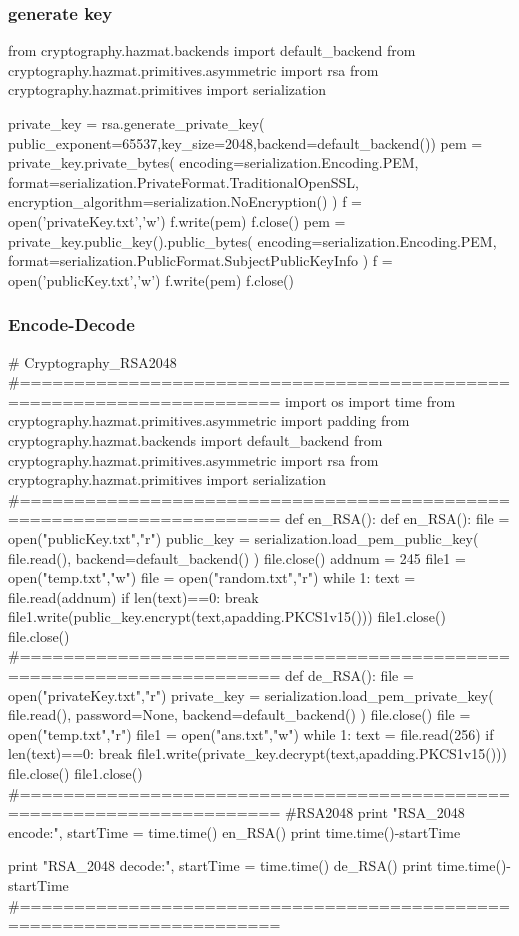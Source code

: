 \documentclass{article}
\begin{document}
\subsubsection{generate key}
\begin{python}
from cryptography.hazmat.backends import default_backend
from cryptography.hazmat.primitives.asymmetric import rsa
from cryptography.hazmat.primitives import serialization

private_key = rsa.generate_private_key(
    public_exponent=65537,key_size=2048,backend=default_backend())
pem = private_key.private_bytes(
    encoding=serialization.Encoding.PEM,
    format=serialization.PrivateFormat.TraditionalOpenSSL,
    encryption_algorithm=serialization.NoEncryption()
)
f = open('privateKey.txt','w')
f.write(pem)
f.close()
pem = private_key.public_key().public_bytes(
    encoding=serialization.Encoding.PEM,
    format=serialization.PublicFormat.SubjectPublicKeyInfo
)
f = open('publicKey.txt','w')
f.write(pem)
f.close()
\end{python}
\subsubsection{Encode-Decode}
\begin{python}
# Cryptography_RSA2048
#======================================================================
import os
import time
from cryptography.hazmat.primitives.asymmetric import padding
from cryptography.hazmat.backends import default_backend
from cryptography.hazmat.primitives.asymmetric import rsa
from cryptography.hazmat.primitives import serialization
#======================================================================
def en_RSA():
    def en_RSA():
    file = open("publicKey.txt","r")
    public_key = serialization.load_pem_public_key(
        file.read(),
        backend=default_backend()
    )
    file.close()
    addnum = 245
    file1 = open("temp.txt","w")
    file = open("random.txt","r")
    while 1:
        text = file.read(addnum)
        if len(text)==0:
            break
        file1.write(public_key.encrypt(text,apadding.PKCS1v15()))
    file1.close()
    file.close()
#======================================================================
def de_RSA():
    file = open("privateKey.txt","r")
    private_key = serialization.load_pem_private_key(
        file.read(),
        password=None,
        backend=default_backend()
    )
    file.close()
    file = open("temp.txt","r")
    file1 = open("ans.txt","w")
    while 1:
        text = file.read(256)
        if len(text)==0:
            break
        file1.write(private_key.decrypt(text,apadding.PKCS1v15()))
    file.close()
    file1.close()
#======================================================================
#RSA2048
print "RSA_2048    encode:",
startTime = time.time()
en_RSA()
print time.time()-startTime

print "RSA_2048    decode:",
startTime = time.time()
de_RSA()
print time.time()-startTime
#======================================================================
\end{python}
\newpage
\end{document}
